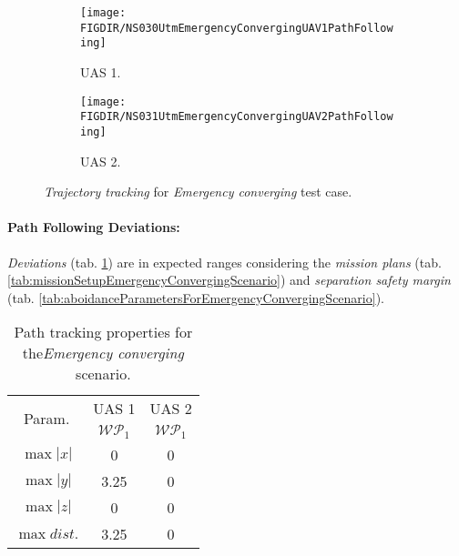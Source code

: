 \begin{figure}[H]
    \centering
    \begin{subfigure}{0.48\textwidth}
    	\centering
        \texttt{[image: \\FIGDIR/NS030UtmEmergencyConvergingUAV1PathFollowing]}
        \caption{UAS 1.}
        \label{fig:emergencyConvergingUAS1PathTracking}
    \end{subfigure}
    \begin{subfigure}{0.48\textwidth}
	    \centering
        \texttt{[image: \\FIGDIR/NS031UtmEmergencyConvergingUAV2PathFollowing]} 
        \caption{UAS 2.}
        \label{fig:emergencyCovnergingUAS2PathTracking}
    \end{subfigure}
    \caption{\emph{Trajectory tracking} for \emph{Emergency converging} test case. }
    \label{fig:emergencyConvergingTrajectoryTrackingPerformance}
\end{figure}

\paragraph{Path Following Deviations:} \emph{Deviations} (tab. \ref{tab:pathTrackingParametersForEmergencyConverging}) are in expected ranges considering the  \emph{mission plans} (tab. \ref{tab:missionSetupEmergencyConvergingScenario}) and \emph{separation safety margin} (tab. \ref{tab:aboidanceParametersForEmergencyConvergingScenario}).
    
\begin{table}[H]
    \centering
    \begin{tabular}{c||c|c}
        \multirow{2}{*}{Param.} & UAS 1     & UAS 2\\\cline{2-3}
                        & $\mathscr{WP}_1$  & $\mathscr{WP}_1$\\\hline\hline
          $\max |x|$    & 0                 & 0 \\\hline
          $\max |y|$    & 3.25              & 0 \\\hline
          $\max |z|$    & 0                 & 0 \\\hline
          $\max dist.$  & 3.25              & 0 \\
    \end{tabular}
    \caption{Path tracking properties for the\emph{Emergency converging} scenario.}
    \label{tab:pathTrackingParametersForEmergencyConverging}
\end{table}


